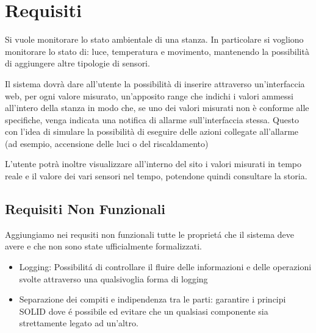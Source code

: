 \section{Requisiti}

Si vuole monitorare lo stato ambientale di una stanza. In particolare si vogliono monitorare lo stato di: luce, temperatura e movimento, mantenendo la possibilità di aggiungere altre tipologie di sensori.

Il sistema dovrà dare all'utente la possibilità di inserire attraverso un'interfaccia web, per ogni valore misurato, un'apposito range che indichi i valori ammessi all'intero della stanza in modo che, se uno dei valori misurati non è conforme alle specifiche, venga indicata una notifica di allarme sull'interfaccia stessa. Questo con l'idea di simulare la possibilità di eseguire delle azioni collegate all'allarme (ad esempio, accensione delle luci o del riscaldamento)

L'utente potrà inoltre visualizzare all'interno del sito i valori misurati in tempo reale e il valore dei vari sensori nel tempo, potendone quindi consultare la storia.

\subsection{Requisiti Non Funzionali}

Aggiungiamo nei requsiti non funzionali tutte le propriet\'a che il sistema deve avere e che non sono state ufficialmente formalizzati.

\begin{itemize}
  \item Logging: Possibilit\'a di controllare il fluire delle informazioni e delle operazioni svolte attraverso una qualsivoglia forma di logging
  \item Separazione dei compiti e indipendenza tra le parti: garantire i principi SOLID dove \'e possibile ed evitare che un qualsiasi componente sia strettamente legato ad un'altro.
\end{itemize}
